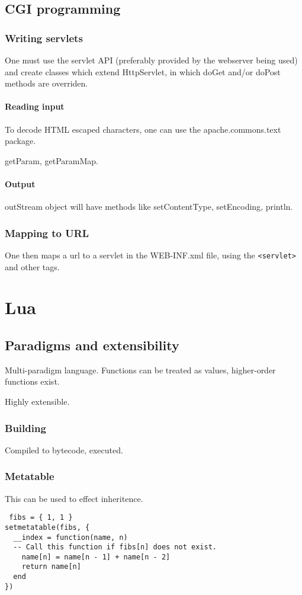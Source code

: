 \documentclass[oneside, article]{memoir}
\begin{document}
\section{CGI programming}
\subsection{Writing servlets}
One must use the servlet API (preferably provided by the webserver being used) and create classes which extend HttpServlet, in which doGet and/or doPost methods are overriden.

\subsubsection{Reading input}
To decode HTML escaped characters, one can use the apache.commons.text package.

getParam, getParamMap.


\subsubsection{Output}
outStream object will have methods like setContentType, setEncoding, println.

\subsection{Mapping to URL}
One then maps a url to a servlet in the WEB-INF.xml file, using the \verb'<servlet>' and other tags.

\chapter{Lua}
\section{Paradigms and extensibility}
Multi-paradigm language. Functions can be treated as values, higher-order functions exist.

Highly extensible. 

\subsection{Building}
Compiled to bytecode, executed.

\subsection{Metatable}
This can be used to effect inheritence.
\begin{verbatim}
 fibs = { 1, 1 }
setmetatable(fibs, {                     
  __index = function(name, n)
  -- Call this function if fibs[n] does not exist.
    name[n] = name[n - 1] + name[n - 2]
    return name[n]                       
  end
})
\end{verbatim}
\end{document}

